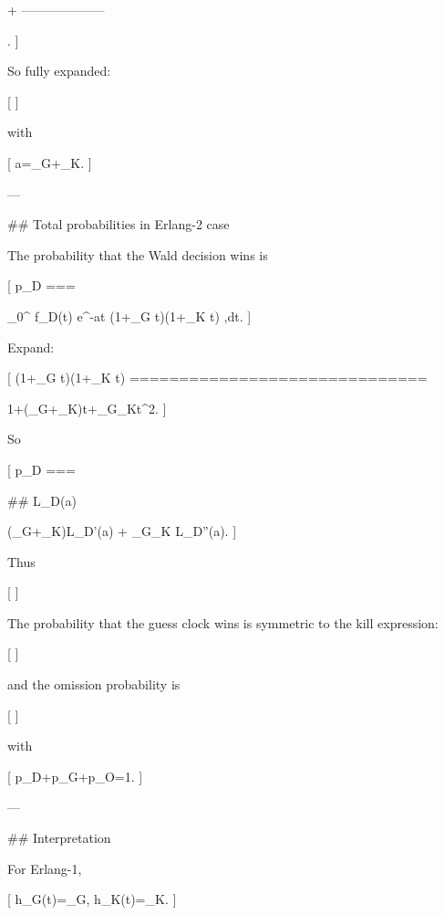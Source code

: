 +
--------------------

.
]

So fully expanded:

[
]

with

[
a=\lambda_G+\lambda_K.
]

---

## Total probabilities in Erlang-2 case

The probability that the Wald decision wins is

[
p_D
===

\int_0^\infty
f_D(t)
e^{-at}
(1+\lambda_G t)(1+\lambda_K t)
,dt.
]

Expand:

[
(1+\lambda_G t)(1+\lambda_K t)
==============================

1+(\lambda_G+\lambda_K)t+\lambda_G\lambda_Kt^2.
]

So

[
p_D
===

## L_D(a)

(\lambda_G+\lambda_K)L_D'(a)
+
\lambda_G\lambda_K L_D''(a).
]

Thus

[
]

The probability that the guess clock wins is symmetric to the kill expression:

[
]

and the omission probability is

[
]

with

[
p_D+p_G+p_O=1.
]

---

## Interpretation

For Erlang-1,

[
h_G(t)=\lambda_G,
\qquad
h_K(t)=\lambda_K.
]

